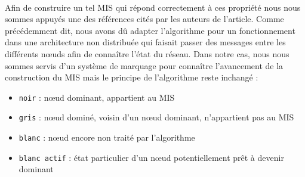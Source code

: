 \paragraph{}
Afin de construire un tel MIS qui répond correctement à ces propriété nous nous sommes appuyés une des références \cite{cardei2002connected} cités par les auteurs de l'article. Comme précédemment dit, nous avons dû adapter l'algorithme pour un fonctionnement dans une architecture non distribuée qui faisait passer des messages entre les différents nœuds afin de connaître l'état du réseau. Dans notre cas, nous nous sommes servis d'un système de marquage pour connaître l'avancement de la construction du MIS mais le principe de l'algorithme reste inchangé :
\begin{itemize}
\item \verb?noir? : nœud dominant, appartient au MIS
\item \verb?gris? : nœud dominé, voisin d'un nœud dominant, n'appartient pas au MIS
\item \verb?blanc? : nœud encore non traité par l'algorithme
\item \verb?blanc actif? : état particulier d'un nœud potentiellement prêt à devenir dominant
\end{itemize}

